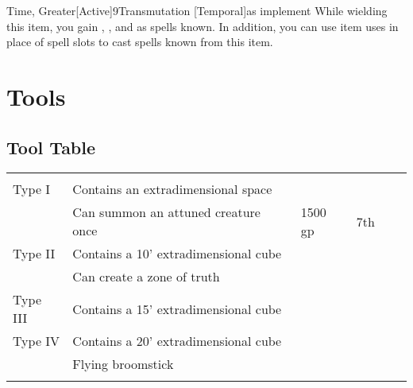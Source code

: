         \begin{magicitemdef}[Arcane]{Time, Greater}[Active]{9}{Transmutation [Temporal]}{as implement}
             While wielding this item, you gain , , and  as spells known.
            In addition, you can use item uses in place of spell slots to cast spells known from this item.
        \end{magicitemdef}

\section{Tools}

    \onecolumn
    \subsection{Tool Table}

        \begin{longtabuwrapper}
            \begin{longtabu}{l X l l l l}
                 &  &  &  &  \\
                 Type I & Contains an extradimensional space &  &  \\
                 & Can summon an attuned creature once & 1500 gp & 7th &  \\
                 Type II & Contains a 10' extradimensional cube &  &  \\
                 & Can create a zone of truth &  &  \\
                 Type III & Contains a 15' extradimensional cube &  &  \\
                 Type IV & Contains a 20' extradimensional cube &  &  \\
                 & Flying broomstick &  &  \\

                 &  &  &  &  \\
            \end{longtabu}
        \end{longtabuwrapper}
        \twocolumn

